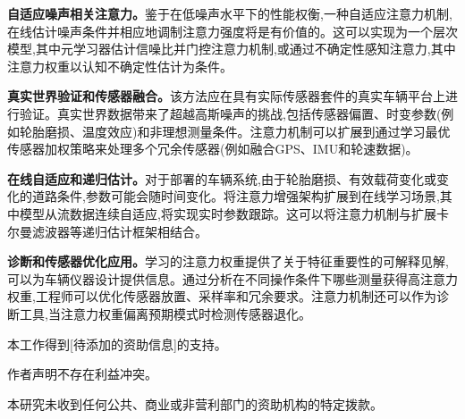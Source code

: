 \documentclass[Afour,sageh,times]{sagej}
\begin{document}
\textbf{自适应噪声相关注意力。}鉴于在低噪声水平下的性能权衡,一种自适应注意力机制,在线估计噪声条件并相应地调制注意力强度将是有价值的。这可以实现为一个层次模型,其中元学习器估计信噪比并门控注意力机制,或通过不确定性感知注意力,其中注意力权重以认知不确定性估计为条件。

\textbf{真实世界验证和传感器融合。}该方法应在具有实际传感器套件的真实车辆平台上进行验证。真实世界数据带来了超越高斯噪声的挑战,包括传感器偏置、时变参数(例如轮胎磨损、温度效应)和非理想测量条件。注意力机制可以扩展到通过学习最优传感器加权策略来处理多个冗余传感器(例如融合GPS、IMU和轮速数据)。

\textbf{在线自适应和递归估计。}对于部署的车辆系统,由于轮胎磨损、有效载荷变化或变化的道路条件,参数可能会随时间变化。将注意力增强架构扩展到在线学习场景,其中模型从流数据连续自适应,将实现实时参数跟踪。这可以将注意力机制与扩展卡尔曼滤波器等递归估计框架相结合。

\textbf{诊断和传感器优化应用。}学习的注意力权重提供了关于特征重要性的可解释见解,可以为车辆仪器设计提供信息。通过分析在不同操作条件下哪些测量获得高注意力权重,工程师可以优化传感器放置、采样率和冗余要求。注意力机制还可以作为诊断工具,当注意力权重偏离预期模式时检测传感器退化。

\begin{acks}
本工作得到[待添加的资助信息]的支持。
\end{acks}

\begin{dci}
作者声明不存在利益冲突。
\end{dci}

\begin{funding}
本研究未收到任何公共、商业或非营利部门的资助机构的特定拨款。
\end{funding}



\end{document}
